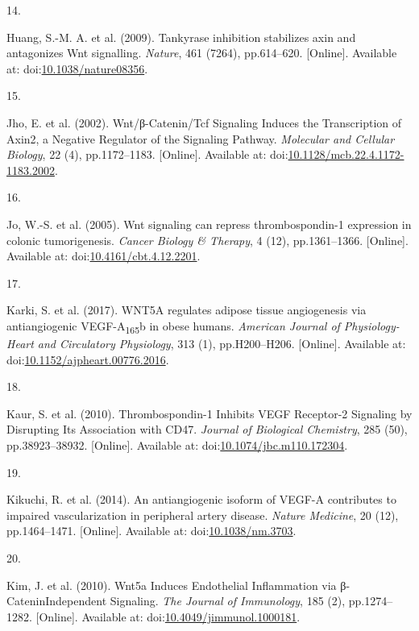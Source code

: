 \documentclass[
  11pt,
]{article}
\newlength{\cslhangindent}
\newlength{\csllabelwidth}
\newlength{\cslentryspacingunit} %
\newenvironment{CSLReferences}[2] %
 {%
  \setlength{\parindent}{0pt}
  \ifodd #1
  \let\oldpar\par
  \def\par{\hangindent=\cslhangindent\oldpar}
  \fi
  \setlength{\parskip}{#2\cslentryspacingunit}
 }%
 {}
\newcommand{\CSLLeftMargin}[1]{\parbox[t]{\csllabelwidth}{#1}}
\newcommand{\CSLRightInline}[1]{\parbox[t]{\linewidth - \csllabelwidth}{#1}\break}
\begin{document}
\begin{CSLReferences}{0}{0}
\leavevmode{}%
\CSLLeftMargin{14. }
\CSLRightInline{Huang, S.-M. A. {et al.} (2009). {Tankyrase inhibition stabilizes axin and antagonizes Wnt signalling}. \emph{Nature}, 461 (7264), pp.614--620. {[}Online{]}. Available at: doi:\href{https://doi.org/10.1038/nature08356}{10.1038/nature08356}.}

\leavevmode{}%
\CSLLeftMargin{15. }
\CSLRightInline{Jho, E. {et al.} (2002). {Wnt/β-Catenin/Tcf Signaling Induces the Transcription of Axin2, a Negative Regulator of the Signaling Pathway}. \emph{Molecular and Cellular Biology}, 22 (4), pp.1172--1183. {[}Online{]}. Available at: doi:\href{https://doi.org/10.1128/mcb.22.4.1172-1183.2002}{10.1128/mcb.22.4.1172-1183.2002}.}

\leavevmode{}%
\CSLLeftMargin{16. }
\CSLRightInline{Jo, W.-S. {et al.} (2005). {Wnt signaling can repress thrombospondin-1 expression in colonic tumorigenesis}. \emph{Cancer Biology \& Therapy}, 4 (12), pp.1361--1366. {[}Online{]}. Available at: doi:\href{https://doi.org/10.4161/cbt.4.12.2201}{10.4161/cbt.4.12.2201}.}

\leavevmode{}%
\CSLLeftMargin{17. }
\CSLRightInline{Karki, S. {et al.} (2017). {WNT5A regulates adipose tissue angiogenesis via antiangiogenic VEGF-A{\textsubscript{165}}b in obese humans}. \emph{American Journal of Physiology-Heart and Circulatory Physiology}, 313 (1), pp.H200--H206. {[}Online{]}. Available at: doi:\href{https://doi.org/10.1152/ajpheart.00776.2016}{10.1152/ajpheart.00776.2016}.}

\leavevmode{}%
\CSLLeftMargin{18. }
\CSLRightInline{Kaur, S. {et al.} (2010). {Thrombospondin-1 Inhibits VEGF Receptor-2 Signaling by Disrupting Its Association with CD47}. \emph{Journal of Biological Chemistry}, 285 (50), pp.38923--38932. {[}Online{]}. Available at: doi:\href{https://doi.org/10.1074/jbc.m110.172304}{10.1074/jbc.m110.172304}.}

\leavevmode{}%
\CSLLeftMargin{19. }
\CSLRightInline{Kikuchi, R. {et al.} (2014). {An antiangiogenic isoform of VEGF-A contributes to impaired vascularization in peripheral artery disease}. \emph{Nature Medicine}, 20 (12), pp.1464--1471. {[}Online{]}. Available at: doi:\href{https://doi.org/10.1038/nm.3703}{10.1038/nm.3703}.}

\leavevmode{}%
\CSLLeftMargin{20. }
\CSLRightInline{Kim, J. {et al.} (2010). {Wnt5a Induces Endothelial Inflammation via β-Catenin{\textendash}Independent Signaling}. \emph{The Journal of Immunology}, 185 (2), pp.1274--1282. {[}Online{]}. Available at: doi:\href{https://doi.org/10.4049/jimmunol.1000181}{10.4049/jimmunol.1000181}.}


\end{CSLReferences}
\end{document}
